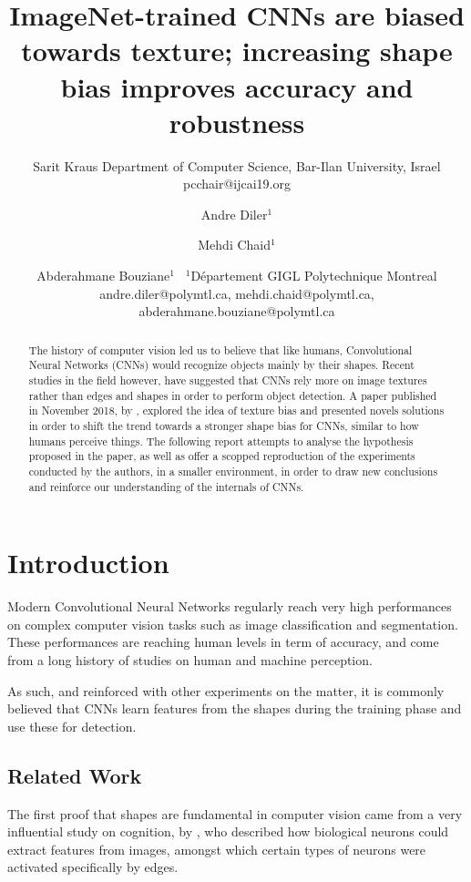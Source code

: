 \documentclass{article}
\title{ImageNet-trained CNNs are biased towards texture; increasing shape bias improves accuracy and robustness}
\author{
    Sarit Kraus
    \affiliations
    Department of Computer Science, Bar-Ilan University, Israel \emails
    pcchair@ijcai19.org
}
\author{
Andre Diler$^1$
\and
Mehdi Chaid$^1$\and
Abderahmane Bouziane$^1$\
\affiliations
$^1$Département GIGL Polytechnique Montreal\\
\emails
andre.diler@polymtl.ca,
mehdi.chaid@polymtl.ca,
abderahmane.bouziane@polymtl.ca
}
\begin{document}
\maketitle

\begin{abstract}
The history of computer vision led us to believe that like humans, 
Convolutional Neural Networks (CNNs) would recognize objects mainly by their shapes.
Recent studies in the field however, have  suggested that CNNs rely more on image textures 
rather than edges and shapes in order to perform object detection. 
A paper published in November 2018, by \cite{geirhos2018imagenettrained}, explored the idea of texture bias
and presented novels solutions in order to shift the trend towards a stronger shape bias for CNNs, similar to 
how humans perceive things.
The following report attempts to analyse the hypothesis proposed in the paper, 
as well as offer a scopped reproduction of the experiments conducted by the authors, in a smaller environment, 
in order to draw new conclusions and reinforce our understanding of the internals of CNNs.
\end{abstract}

\section{Introduction}


Modern Convolutional Neural Networks regularly reach very high performances on complex computer vision tasks 
such as image classification and segmentation.
These performances are reaching human levels in term of accuracy, and come from a long history of studies 
on human and machine perception. \medskip \par 

\noindent
As such, and reinforced with other experiments on the matter, 
it is commonly believed that CNNs learn features from the shapes during the training phase
and use these for detection.

\subsection{Related Work}

\noindent
The first proof that shapes are fundamental in computer vision came from a very influential study on cognition, 
by \cite{hubel1959receptive}, who described how biological neurons could extract features from images,
amongst which certain types of neurons were activated specifically by edges. \medskip \par 
\end{document}
